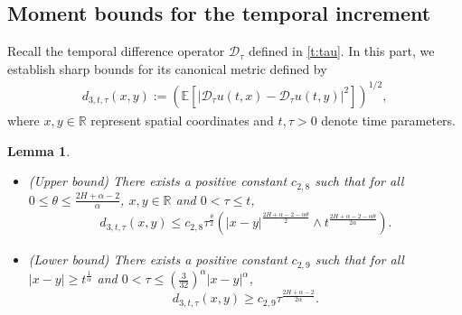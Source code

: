 \documentclass[11pt,reqno]{amsart}
\numberwithin{equation}{section}
\newtheorem{lemma}{Lemma}[section]
\newcommand{\1}{{\bf 1}}
\newcommand{\2}{{\bf 2}}
\begin{document}
\subsection{Moment bounds for the temporal increment}
Recall the temporal difference operator $\mathcal D_{\tau}$ defined in \eqref{t:tau}.   In this part,  we establish sharp bounds for its canonical metric defined by
\begin{align}\label{eq:d3}
d_{3,t,\tau}(x,y)  := \left(\mathbb{E}\left[|\mathcal D_{\tau} u(t,x) - \mathcal D_{\tau} u(t,y)|^2\right]\right)^{1/2},
\end{align}
where $x,y \in \mathbb{R}$ represent spatial coordinates and $t, \tau > 0$ denote time parameters.

 \begin{lemma}\label{lem:diff3} 
\begin{itemize}
\item[(a)] (Upper bound)   There exists a positive constant $c_{2,8}$ such that for all   $0 \leq \theta \leq \frac{2H + \alpha - 2}{\alpha}$,  $x, y \in \mathbb{R}$ and   $0 < \tau \leq t$,
 \begin{align}\label{U-h-dEu 3-0}
   d_{3, t,\tau}(x,y)\leq c_{2,8} \tau^{\frac{\theta}{2}} \left(|x-y|^{\frac{2H+\alpha-2-\alpha\theta}{2}}\wedge t^{\frac{2H+\alpha-2-\alpha\theta}{2\alpha}}\right).
 \end{align}
 \item[(b)] (Lower bound)
 There exists a positive constant $c_{2,9}$ such that for all $|x-y|\geq t^{\frac1{\alpha}}$
  and $0 < \tau \leq \left(\frac{3}{32}\right)^{\alpha}|x-y|^{\alpha}$,
\begin{equation}\label{U-h-dEu 3}
       d_{3, t,\tau}(x,y)\geq  c_{2,9} \tau^{\frac{2H+\alpha-2}{2\alpha}}.
  \end{equation}
  \end{itemize}
  \end{lemma}
\end{document}
